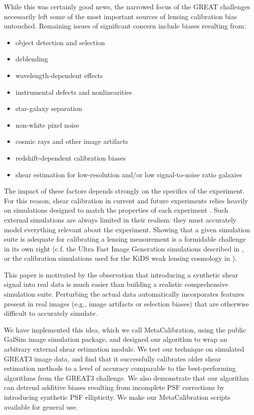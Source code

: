 \documentclass[iop]{emulateapj}
\begin{document}
While this was certainly good news, the narrowed focus of the GREAT
challenges necessarily left some of the most important sources of
lensing calibration bias untouched. Remaining issues of significant
concern include biases resulting from:
\begin{itemize}
\item object detection and selection
\item deblending
\item wavelength-dependent effects
\item instrumental defects and nonlinearities
\item star-galaxy separation
\item non-white pixel noise
\item cosmic rays and other image artifacts
\item redshift-dependent calibration biases
\item shear estimation for low-resolution and/or low signal-to-noise ratio galaxies
\end{itemize}
The impact of these factors depends strongly on the specifics of the
experiment. For this reason, shear calibration in current and future
experiments relies heavily on simulations designed to match the
properties of each experiment
\citep{KiDS450,2016MNRAS.tmp..827J}. Such external
simulations are always limited in their realism: they must accurately
model everything relevant about the experiment. Showing that a given
simulation suite is adequate for calibrating a lensing measurement is
a formidable challenge in its own right (c.f. the Ultra Fast Image
Generation simulations described in \citealt{2013A&C.....1...23B}, or
the calibration simulations used for the KiDS weak lensing cosmology
in \citealt{2016arXiv160605337F}).

This paper is motivated by the observation that introducing a
synthetic shear signal into real data is much easier than building a
realistic comprehensive simulation suite. Perturbing the actual data
automatically incorporates features present in real images (e.g.,
image artifacts or selection biases) that are otherwise difficult to
accurately simulate.

We have implemented this idea, which we call MetaCalibration, using
the public GalSim \citep{2015A&C....10..121R} image simulation
package, and designed our algorithm to wrap an arbitrary external
shear estimation module. We test our technique on simulated GREAT3
image data, and find that it successfully calibrates older shear
estimation methods to a level of accuracy comparable to the
best-performing algorithms from the GREAT3 challenge. We also
demonstrate that our algorithm can detrend additive biases resulting
from incomplete PSF corrections by introducing synthetic PSF
ellipticity.  We make our MetaCalibration scripts available for
general use.
\end{document}
